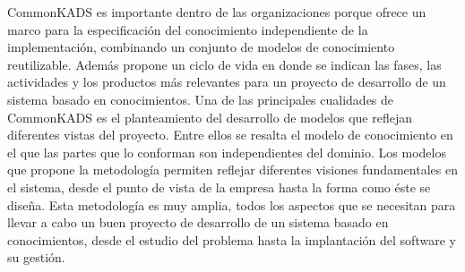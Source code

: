 CommonKADS es importante dentro de las organizaciones porque ofrece un marco para la especificación del conocimiento independiente de la implementación, combinando un conjunto de modelos de conocimiento reutilizable. Además propone un ciclo de vida en donde se indican las fases, las actividades y los productos más relevantes para un proyecto de desarrollo de un sistema basado en conocimientos.
Una de las principales cualidades de CommonKADS es el planteamiento del desarrollo de modelos que reflejan diferentes vistas del proyecto. Entre ellos se resalta el modelo de conocimiento en el que las partes que lo conforman son independientes del dominio.
Los modelos que propone la metodología permiten reflejar diferentes visiones fundamentales en el sistema, desde el punto de vista de la empresa hasta la forma como éste se diseña. Esta metodología es muy amplia, todos los aspectos que se necesitan para llevar a cabo un buen proyecto de desarrollo de un sistema basado en conocimientos, desde el estudio del problema hasta la implantación del software y su gestión.

